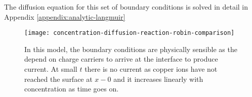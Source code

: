 The diffusion equation for this set of boundary conditions is solved in detail in Appendix \ref{appendix:analytic-langmuir}





\begin{figure}[htbp]
\centering
\texttt{[image: concentration-diffusion-reaction-robin-comparison]}
\caption{In this model, the boundary conditions are physically sensible as the depend on charge carriers to arrive at the interface to produce current. At small $t$ there is no current as copper ions have not reached the surface at $x-0$ and it increases linearly with concentration as time goes on.}
\label{fig:diffusion-reaction-comparison}
\end{figure}

\newpage